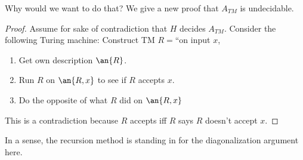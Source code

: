 \vskip0.15in
Why would we want to do that? We give a new proof that $A_{TM}$ is undecidable.
\begin{proof}
Assume for sake of contradiction that $H$ decides $A_{TM}$. Consider the following Turing machine: Construct TM $R=$``on input $x$, 
\begin{enumerate}
\item
Get own description $\an{R}$.
\item
Run $R$ on $\an{R,x}$ to see if $R$ accepts $x$. %
\item %
Do the opposite of what $R$ did on $\an{R,x}$
\end{enumerate}
This is a contradiction because $R$ accepts iff $R$ says $R$ doesn't accept $x$.
\end{proof}
In a sense, the recursion method is standing in for the   diagonalization argument here. %


